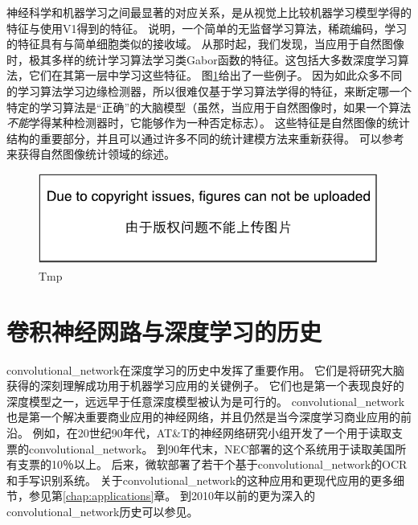 神经科学和机器学习之间最显著的对应关系，是从视觉上比较机器学习模型学得的特征与使用V1得到的特征。
\cite{Olshausen+Field-1996}说明，一个简单的无监督学习算法，稀疏编码，学习的特征具有与简单细胞类似的接收域。
从那时起，我们发现，当应用于自然图像时，极其多样的统计学习算法学习类Gabor函数的特征。这包括大多数深度学习算法，它们在其第一层中学习这些特征。
图\ref{fig:chap9_feature_detectors}给出了一些例子。
因为如此众多不同的学习算法学习边缘检测器，所以很难仅基于学习算法学得的特征，来断定哪一个特定的学习算法是``正确''的大脑模型（虽然，当应用于自然图像时，如果一个算法\emph{不能}学得某种检测器时，它能够作为一种否定标志）。
这些特征是自然图像的统计结构的重要部分，并且可以通过许多不同的统计建模方法来重新获得。
可以参考\citep{hyvarinen-book2009}来获得自然图像统计领域的综述。
\begin{figure}
\ifOpenSource
\centerline{\includegraphics{figure.pdf}}
\else
\centering    
{}     
\fi
\caption{Tmp}     
\label{fig:chap9_feature_detectors}     
\end{figure}

\section{卷积神经网路与深度学习的历史}
\label{sec:convolutional_networks_and_the_history_of_deep_learning}
 
 
\gls{convolutional_network}在深度学习的历史中发挥了重要作用。
它们是将研究大脑获得的深刻理解成功用于机器学习应用的关键例子。
它们也是第一个表现良好的深度模型之一，远远早于任意深度模型被认为是可行的。
\gls{convolutional_network}也是第一个解决重要商业应用的神经网络，并且仍然是当今深度学习商业应用的前沿。
例如，在20世纪90年代，AT\&T的神经网络研究小组开发了一个用于读取支票的\gls{convolutional_network}\citep{chapter-gradient-document-2001}。
到90年代末，NEC部署的这个系统用于读取美国所有支票的10％以上。
后来，微软部署了若干个基于\gls{convolutional_network}的OCR和手写识别系统\citep{simard-03-small}。 
关于\gls{convolutional_network}的这种应用和更现代应用的更多细节，参见第\ref{chap:applications}章。
到2010年以前的更为深入的\gls{convolutional_network}历史可以参见\citep{Lecun_convolutionalnetworks}。

